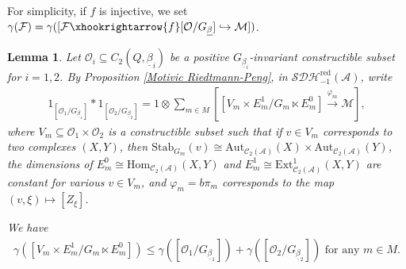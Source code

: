 \documentclass[12pt]{amsart}
\newtheorem{lemma}[theorem]{Lemma}
\theoremstyle{definition}
\numberwithin{equation}{section}
\begin{document}
For simplicity, if $ f $ is injective, we set $ \gamma(\mathcal{F}) = \gamma ([\mathcal{F} \xhookrightarrow{f} [\mathcal{O}/G_{\underline{\beta}}]\hookrightarrow \mathcal{M}]) $. 


\begin{lemma}
    \label{Inequality for gamma in C2A+}
    Let $ \mathcal{O}_i \subseteq  C_2(Q,\underline{\beta}_i) $ be a positive $ G_{\underline{\beta}_i} $-invariant constructible subset for $ i=1,2 $. 
    By Proposition \ref{Motivic Riedtmann-Peng}, in $ \mathcal{SDH}_{-1}^{\mathrm{red}}(\mathcal{A}) $, write
     \begin{align*}
    1_{[\mathcal{O}_1/G_{\underline{\beta}_1}]} * 1_{[\mathcal{O}_2/G_{\underline{\beta}_2}]} = 1 \otimes \sum_{m \in M} [[V_m \times E_m^1/G_m \ltimes E_m^0] \xrightarrow{\varphi_m} \mathcal{M}],
    \end{align*}
    where $ V_m \subseteq \mathcal{O}_1 \times \mathcal{O}_2 $ is a constructible subset such that if  $ v \in V_m $ corresponds to two complexes $ (X,Y) $, then $ \mathrm{Stab}_{G_m}(v) \cong \mathrm{Aut}_{\mathcal{C}_2(\mathcal{A})}(X) \times \mathrm{Aut}_{\mathcal{C}_2(\mathcal{A})}(Y) $, the dimensions of $ E_m^0 \cong \mathrm{Hom_{\mathcal{C}_2(\mathcal{A})}}(X,Y) $ and $ E_m^1 \cong \mathrm{Ext^1_{\mathcal{C}_2(\mathcal{A})}}(X,Y) $ are constant for various $ v \in V_m $, and $  \varphi_m = b\pi_m $ corresponds to the map $ (v,\xi) \mapsto [Z_{\xi}] $. 
   
    We have
    \begin{align*}
        \gamma([V_m \times E_m^1/G_m \ltimes E_m^0]) \leqslant \gamma([\mathcal{O}_1/G_{\underline{\beta}_1}]) + \gamma([\mathcal{O}_2/G_{\underline{\beta}_2}]) \text{ for any } m \in M.
    \end{align*}    
\end{lemma}
     
    
\end{document}
